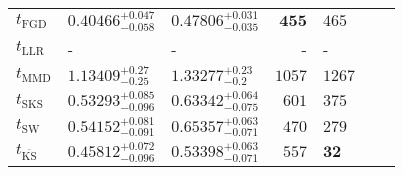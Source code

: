 \begin{tabular}{l|llr|llr}
	\midrule
	$t_{\mathrm{FGD}}$ & ${\mathbf{0.40466_{-0.058}^{+0.047}}}$ & ${\mathbf{0.47806_{-0.035}^{+0.031}}}$ & ${\mathbf{455}}$ & $465$ \\
	$t_{\mathrm{LLR}}$ & - & - & - & - \\
	$t_{\mathrm{MMD}}$ & $1.13409_{-0.25}^{+0.27}$ & $1.33277_{-0.2}^{+0.23}$ & $1057$ & $1267$ \\
	$t_{\mathrm{SKS}}$ & $0.53293_{-0.096}^{+0.085}$ & $0.63342_{-0.075}^{+0.064}$ & $601$ & $375$ \\
	$t_{\mathrm{SW}}$ & $0.54152_{-0.091}^{+0.081}$ & $0.65357_{-0.071}^{+0.063}$ & $470$ & $279$ \\
	$t_{\overline{\mathrm{KS}}}$ & $0.45812_{-0.096}^{+0.072}$ & $0.53398_{-0.071}^{+0.063}$ & $557$ & ${\mathbf{32}}$ \\
	\bottomrule
\end{tabular}